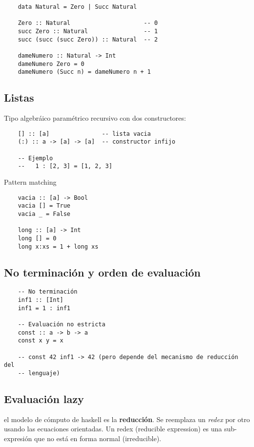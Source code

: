 \documentclass{report}
\theoremstyle{definition} %
\begin{document}
\begin{verbatim}
    data Natural = Zero | Succ Natural

    Zero :: Natural                     -- 0
    succ Zero :: Natural                -- 1
    succ (succ (succ Zero)) :: Natural  -- 2

    dameNumero :: Natural -> Int
    dameNumero Zero = 0
    dameNumero (Succ n) = dameNumero n + 1
\end{verbatim}

\subsection{Listas}

Tipo algebráico paramétrico recursivo con dos constructores:

\begin{verbatim}
    [] :: [a]               -- lista vacia
    (:) :: a -> [a] -> [a]  -- constructor infijo

    -- Ejemplo
    --   1 : [2, 3] = [1, 2, 3]
\end{verbatim}

Pattern matching

\begin{verbatim}
    vacia :: [a] -> Bool
    vacia [] = True
    vacia _ = False

    long :: [a] -> Int
    long [] = 0
    long x:xs = 1 + long xs
\end{verbatim}

\subsection{No terminación y orden de evaluación}

\begin{verbatim}
    -- No terminación
    inf1 :: [Int]
    inf1 = 1 : inf1

    -- Evaluación no estricta
    const :: a -> b -> a
    const x y = x

    -- const 42 inf1 -> 42 (pero depende del mecanismo de reducción del
    -- lenguaje)
\end{verbatim}

\subsection{Evaluación lazy}

el modelo de cómputo de haskell es la \textbf{reducción}. Se reemplaza un
\textit{redex} por otro usando las ecuaciones orientadas. Un redex (reducible
expression) es una sub-expresión que no está en forma normal (irreducible).
\end{document}
